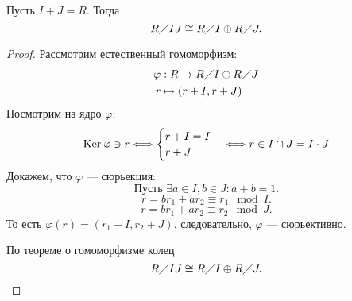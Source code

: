 \documentclass[11pt]{book}
\renewcommand{\ker}{{\mathop{\text{\rm Ker}}}\:}
\theoremstyle{definition}
\theoremstyle{plain}
\theoremstyle{plain}
\theoremstyle{definition}
\theoremstyle{remark}
\begin{document}
\begin{thm}
    Пусть $ I + J = R$. Тогда \[
	R \diagup  {IJ} \cong R \diagup I \oplus R \diagup  J
    .\]
\end{thm}
\begin{proof}
    Рассмотрим естественный гомоморфизм:
    \begin{align*}
	\varphi & : R \to  R \diagup I \oplus R \diagup  J \\
	r & \mapsto (r + I, r + J)
    \end{align*}
    Посмотрим на ядро $ \varphi $:
    $$ \ker \varphi  \ni r \Longleftrightarrow
    \begin{cases}
	r + I = I \\
	r + J
    \end{cases}
    \Longleftrightarrow r \in  I \cap  J = I \cdot J
    $$
    Докажем, что $ \varphi $ --- сюрьекция:
    \[
	\text{Пусть } \exists  a \in I, b \in J: a + b = 1
    .\]
    \[
	r = br_1+ar_2 \equiv r_1 \mod I
    .\]
    \[
	r = br_1+ar_2 \equiv r_2 \mod J
    .\]
    То есть $ \varphi (r) =  (r_1 + I, r_2 + J)$, следовательно, $ \varphi $ --- сюрьективно.

    По теореме о гомоморфизме колец \[
	R \diagup {IJ} \cong R\diagup I \oplus R\diagup J
    .\]
\end{proof}
\end{document}
